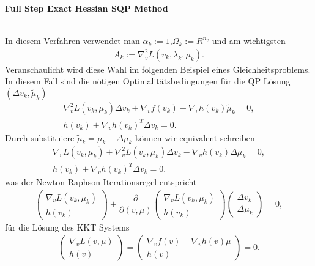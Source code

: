 \documentclass[12pt,a4paper]{article}
\begin{document}
  \begin{large}
  \textbf{Full Step Exact Hessian SQP Method}
  \end{large} \\
  In diesem Verfahren verwendet man  $ \alpha_{k} := 1 $,$ \Omega_{k} := R^{n_{v}} $ und am wichtigsten
  \begin{align*}
  A_{k} := \nabla^{2}_{v} L(v_{k},\lambda_{k},\mu_{k}).
  \end{align*}
  Veranschaulicht wird diese Wahl im folgenden Beispiel eines Gleichheitsproblems. In diesem Fall sind die nötigen Optimalitätsbedingungen für die QP Lösung $ ( \Delta v_{k} ,\tilde{\mu}_{k} ) $
  \begin{align*}
  \nabla ^{2}_{v} L(v_{k},\mu_{k}) \Delta v_{k} + \nabla_{v} f(v_{k}) - \nabla_{v} h(v_{k}) \tilde{\mu}_{k} = 0, \\
  h(v_{k}) + \nabla_{v} h(v_{k})^{T} \Delta v_{k} = 0.
  \end{align*}
  Durch substituiere $ \tilde{\mu}_{k} = \mu_{k} - \Delta \mu_{k} $ können wir equivalent schreiben
  \begin{align*}
  \nabla_{v} L(v_{k},\mu_{k}) + \nabla ^{2}_{v} L(v_{k},\mu_{k})  \Delta v_{k} - \nabla_{v} h(v_{k}) \Delta \mu_{k} = 0, \\
  h(v_{k}) + \nabla_{v} h(v_{k})^{T} \Delta v_{k} = 0.
  \end{align*}
  was der Newton-Raphson-Iterationsregel entspricht
  \begin{align*}
  \left( \begin{array}{c} \nabla_{v} L(v_{k},\mu_{k}) \\ h(v_{k}) \end{array} \right) + \dfrac{\partial}{\partial (v,\mu)}
  \left( \begin{array}{c} \nabla_{v} L(v_{k},\mu_{k}) \\ h(v_{k}) \end{array} \right) 
  \left( \begin{array}{c} \Delta v_{k} \\ \Delta \mu_{k}  \end{array} \right) = 0,
  \end{align*}
  für die Lösung des KKT Systems
  \begin{align*}
  \left( \begin{array}{c} \nabla_{v} L(v,\mu) \\ h(v) \end{array} \right) = 
  \left( \begin{array}{c} \nabla_{v} f(v) - \nabla_{v} h(v) \mu \\ h(v) \end{array} \right) = 0.
  \end{align*}
\end{document}

